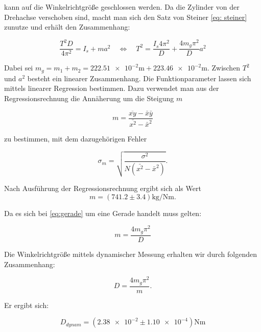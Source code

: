 kann auf die Winkelrichtgröße geschlossen werden.
Da die Zylinder von der Drehachse verschoben sind, macht man sich den
Satz von Steiner \eqref{eq: steiner} zunutze und erhält den Zusammenhang: %

\begin{equation}
\label{eq:gerade}
\frac{T^2D}{4\pi^2}=I_s+ma^2\quad \Leftrightarrow \quad T^2=\frac{I_s 4\pi^2}{D}+\frac{4m_g\pi^2}{D}a^2
\end{equation}

Dabei sei $m_g=m_1+m_2=\num{222.51e-2}\si{\meter}+\num{223.46e-2}\si{\meter}$.
Zwischen $T^2$ und $a^2$ besteht ein linearer Zusammenhang.
Die Funktionparameter lassen sich mittels linearer Regression bestimmen. %
Dazu verwendet man aus der Regressionsrechnung
die Annäherung um die Steigung $m$

\begin{equation*}
m=\frac{\overline{xy}-\bar{x}\bar{y}}{\bar{x^2}-\bar{x}^2}
\end{equation*}

zu bestimmen, mit dem dazugehörigen Fehler

\begin{equation*}
\sigma_m=\sqrt{\frac{\sigma^2}{N(\bar{x^2}-\bar{x}^2)}}.
\end{equation*}

Nach Ausführung der Regressionsrechnung ergibt sich als Wert
\begin{equation}
\label{eq: steigung}
m=\left(\num{741.2}\pm\num{3.4}\right) \si{\kilogram\per\newton\meter}.
\end{equation}

Da es sich bei \eqref{eq:gerade} um eine Gerade handelt muss gelten:

\begin{equation*}
m=\frac{4m_g\pi^2}{D}
\end{equation*}

Die Winkelrichtgröße mittels dynamischer Messung erhalten wir durch folgenden 
Zusammenhang: %

\begin{equation*}
D=\frac{4m_g\pi^2}{m}.
\end{equation*}

Er ergibt sich:

\begin{equation}
\label{winkelrichtgroesse_dynamisch}
D_{dynam}=\left(\num{2.38e-2} \pm \num{1.10e-4}\right)\si{\newton\meter}
\end{equation}

